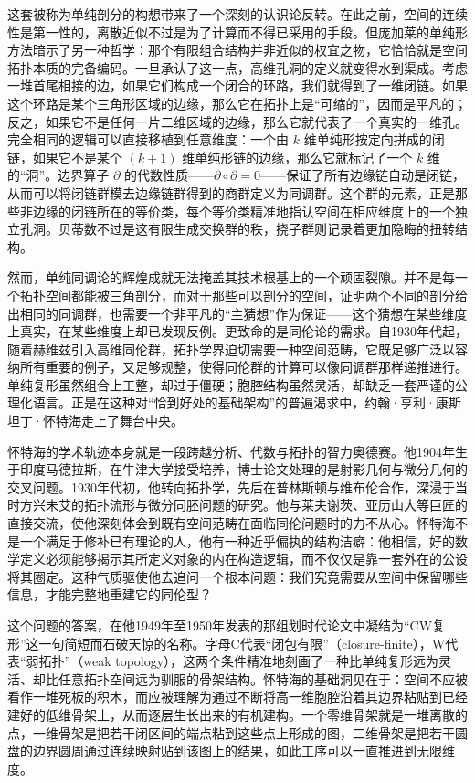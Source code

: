 \documentclass[12pt,a4paper]{article}
\begin{document}
这套被称为单纯剖分的构想带来了一个深刻的认识论反转。在此之前，空间的连续性是第一性的，离散近似不过是为了计算而不得已采用的手段。但庞加莱的单纯形方法暗示了另一种哲学：那个有限组合结构并非近似的权宜之物，它恰恰就是空间拓扑本质的完备编码。一旦承认了这一点，高维孔洞的定义就变得水到渠成。考虑一堆首尾相接的边，如果它们构成一个闭合的环路，我们就得到了一维闭链。如果这个环路是某个三角形区域的边缘，那么它在拓扑上是“可缩的”，因而是平凡的；反之，如果它不是任何一片二维区域的边缘，那么它就代表了一个真实的一维孔。完全相同的逻辑可以直接移植到任意维度：一个由 $k$ 维单纯形按定向拼成的闭链，如果它不是某个 $(k+1)$ 维单纯形链的边缘，那么它就标记了一个 $k$ 维的“洞”。边界算子 $\partial$ 的代数性质——$\partial \circ \partial = 0$——保证了所有边缘链自动是闭链，从而可以将闭链群模去边缘链群得到的商群定义为同调群。这个群的元素，正是那些非边缘的闭链所在的等价类，每个等价类精准地指认空间在相应维度上的一个独立孔洞。贝蒂数不过是这有限生成交换群的秩，挠子群则记录着更加隐晦的扭转结构。

然而，单纯同调论的辉煌成就无法掩盖其技术根基上的一个顽固裂隙。并不是每一个拓扑空间都能被三角剖分，而对于那些可以剖分的空间，证明两个不同的剖分给出相同的同调群，也需要一个非平凡的“主猜想”作为保证——这个猜想在某些维度上真实，在某些维度上却已发现反例。更致命的是同伦论的需求。自1930年代起，随着赫维兹引入高维同伦群，拓扑学界迫切需要一种空间范畴，它既足够广泛以容纳所有重要的例子，又足够规整，使得同伦群的计算可以像同调群那样递推进行。单纯复形虽然组合上工整，却过于僵硬；胞腔结构虽然灵活，却缺乏一套严谨的公理化语言。正是在这种对“恰到好处的基础架构”的普遍渴求中，约翰·亨利·康斯坦丁·怀特海走上了舞台中央。

怀特海的学术轨迹本身就是一段跨越分析、代数与拓扑的智力奥德赛。他1904年生于印度马德拉斯，在牛津大学接受培养，博士论文处理的是射影几何与微分几何的交叉问题。1930年代初，他转向拓扑学，先后在普林斯顿与维布伦合作，深浸于当时方兴未艾的拓扑流形与微分同胚问题的研究。他与莱夫谢茨、亚历山大等巨匠的直接交流，使他深刻体会到既有空间范畴在面临同伦问题时的力不从心。怀特海不是一个满足于修补已有理论的人，他有一种近乎偏执的结构洁癖：他相信，好的数学定义必须能够揭示其所定义对象的内在构造逻辑，而不仅仅是靠一套外在的公设将其圈定。这种气质驱使他去追问一个根本问题：我们究竟需要从空间中保留哪些信息，才能完整地重建它的同伦型？

这个问题的答案，在他1949年至1950年发表的那组划时代论文中凝结为“CW复形”这一句简短而石破天惊的名称。字母C代表“闭包有限”（closure-finite），W代表“弱拓扑”（weak topology），这两个条件精准地刻画了一种比单纯复形远为灵活、却比任意拓扑空间远为驯服的骨架结构。怀特海的基础洞见在于：空间不应被看作一堆死板的积木，而应被理解为通过不断将高一维胞腔沿着其边界粘贴到已经建好的低维骨架上，从而逐层生长出来的有机建构。一个零维骨架就是一堆离散的点，一维骨架是把若干闭区间的端点粘到这些点上形成的图，二维骨架是把若干圆盘的边界圆周通过连续映射贴到该图上的结果，如此工序可以一直推进到无限维度。
\end{document}
